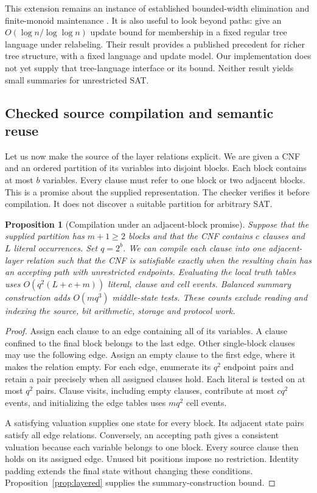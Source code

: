 \documentclass[11pt,a4paper]{article}
\numberwithin{equation}{section}
\theoremstyle{plain}
\newtheorem{proposition}[lemma]{Proposition}
\theoremstyle{definition}
\theoremstyle{remark}
\begin{document}
This extension remains an instance of established bounded-width elimination and finite-monoid maintenance \citep{dechter1999bucket,amarilli2021dynamic}. It is also useful to look beyond paths: \citet{amarilli2025trees} give an $O(\log n/\log\log n)$ update bound for membership in a fixed regular tree language under relabeling. Their result provides a published precedent for richer tree structure, with a fixed language and update model. Our implementation does not yet supply that tree-language interface or its bound. Neither result yields small summaries for unrestricted SAT.

\subsection{Checked source compilation and semantic reuse}
\label{sec:source-binding}

Let us now make the source of the layer relations explicit. We are given a CNF and an ordered partition of its variables into disjoint blocks. Each block contains at most $b$ variables. Every clause must refer to one block or two adjacent blocks. This is a promise about the supplied representation. The checker verifies it before compilation. It does not discover a suitable partition for arbitrary SAT.

\begin{proposition}[Compilation under an adjacent-block promise]
\label{prop:adjacent-source}
Suppose that the supplied partition has $m+1\geq2$ blocks and that the CNF contains $c$ clauses and $L$ literal occurrences. Set $q=2^b$. We can compile each clause into one adjacent-layer relation such that the CNF is satisfiable exactly when the resulting chain has an accepting path with unrestricted endpoints. Evaluating the local truth tables uses $O(q^2(L+c+m))$ literal, clause and cell events. Balanced summary construction adds $O(mq^3)$ middle-state tests. These counts exclude reading and indexing the source, bit arithmetic, storage and protocol work.
\end{proposition}

\begin{proof}
Assign each clause to an edge containing all of its variables. A clause confined to the final block belongs to the last edge. Other single-block clauses may use the following edge. Assign an empty clause to the first edge, where it makes the relation empty. For each edge, enumerate its $q^2$ endpoint pairs and retain a pair precisely when all assigned clauses hold. Each literal is tested on at most $q^2$ pairs. Clause visits, including empty clauses, contribute at most $cq^2$ events, and initializing the edge tables uses $mq^2$ cell events.

A satisfying valuation supplies one state for every block. Its adjacent state pairs satisfy all edge relations. Conversely, an accepting path gives a consistent valuation because each variable belongs to one block. Every source clause then holds on its assigned edge. Unused bit positions impose no restriction. Identity padding extends the final state without changing these conditions. Proposition~\ref{prop:layered} supplies the summary-construction bound.
\end{proof}
\end{document}
